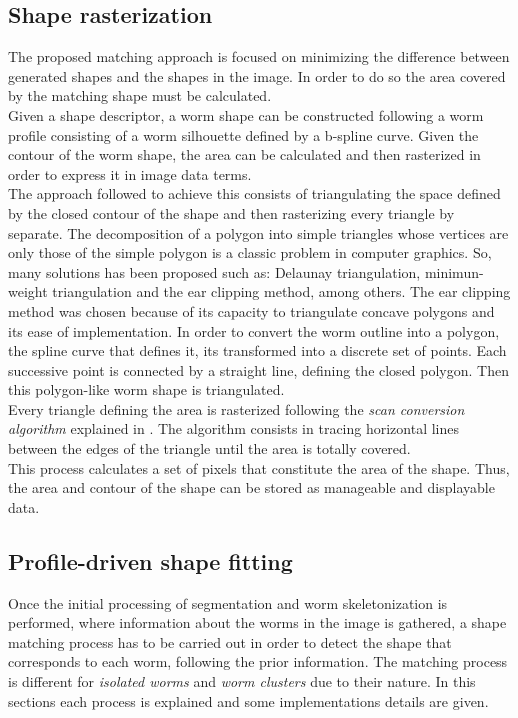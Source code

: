\subsection{Shape rasterization}
\label{sec:metrast}

The proposed matching approach is focused on minimizing the difference between generated
shapes and the shapes in the image. In order to do so the area covered by the matching shape
must be calculated.\\ 
Given a shape descriptor, a worm shape can be
constructed following a worm profile consisting of a worm silhouette defined by 
a b-spline curve. Given the contour of the worm shape, the area can be calculated and 
then rasterized in order to express it in image data terms.\\

The approach followed to achieve this consists of triangulating the space defined by the
closed contour of the shape and then rasterizing every triangle by separate. The
decomposition of a polygon into simple triangles whose vertices are only those of
the simple polygon is a classic problem in computer graphics. So, many solutions
has been proposed such as: Delaunay triangulation, minimun-weight triangulation and
the ear clipping method, among others. The ear clipping method was chosen because
of its capacity to triangulate concave polygons and its ease of implementation.
In order to convert the worm outline into a polygon, the spline curve that defines it,
its transformed into a discrete set of points. Each successive point is connected
by a straight line, defining the closed polygon. Then this polygon-like worm shape
is triangulated.\\

Every triangle defining the area is rasterized following the \emph{scan conversion algorithm}
explained in \cite{scanconversion}. The algorithm consists in tracing horizontal lines 
between the edges of the triangle until the area is totally covered.\\

This process calculates a set of pixels that constitute the area of the shape. Thus, 
the area and contour of the shape can be stored as manageable and displayable data.


\subsection{Profile-driven shape fitting}
\label{sec:metfit}

Once the initial processing of segmentation and worm skeletonization is performed, where 
information about the worms in the image is gathered, a shape matching process has to be 
carried out in order to detect the shape that corresponds to each worm, 
following the prior information. The matching process is different for
\emph{isolated worms} and \emph{worm clusters}  
due to their nature. In this sections each process is explained and some 
implementations details are given.


